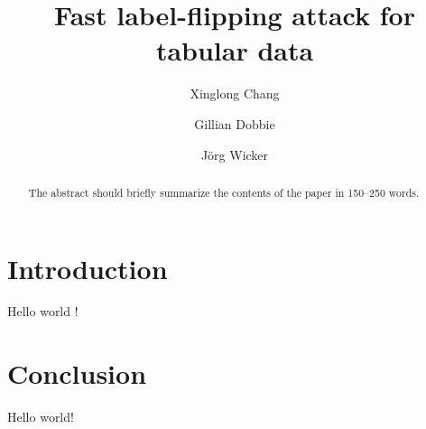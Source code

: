 \documentclass[runningheads]{llncs}
\begin{document}
%
\title{Fast label-flipping attack for tabular data}
%
%
\author{
    Xinglong Chang \and
    Gillian Dobbie \and
    J\"org Wicker
}
%
%
%
\maketitle              %
%
\begin{abstract}
The abstract should briefly summarize the contents of the paper in
150--250 words.

\end{abstract}
%
%
%
\section{Introduction}
Hello world \cite{ref_article1}!

\section{Conclusion}
Hello world!

%
%
%


%
\end{document}
